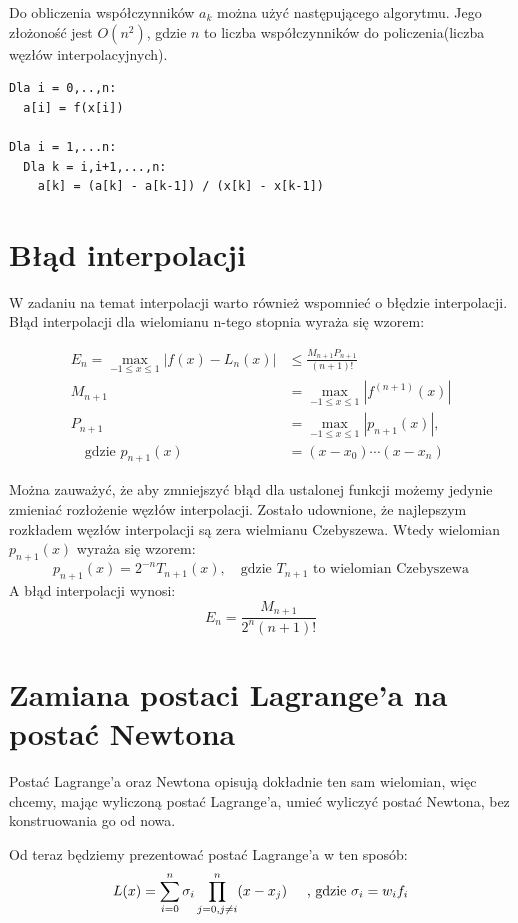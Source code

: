 \documentclass[a4paper]{article}
\begin{document}
Do obliczenia współczynników $a_k$ można użyć następującego algorytmu. Jego złożoność jest $O(n^2)$,
gdzie $n$ to liczba współczynników do policzenia(liczba węzłów interpolacyjnych).

\begin{verbatim}
Dla i = 0,..,n:
  a[i] = f(x[i])

Dla i = 1,...n:
  Dla k = i,i+1,...,n:
    a[k] = (a[k] - a[k-1]) / (x[k] - x[k-1])
\end{verbatim}


\section{Błąd interpolacji}
W zadaniu na temat interpolacji warto również wspomnieć o błędzie interpolacji. Błąd interpolacji
dla wielomianu n-tego stopnia wyraża się wzorem:

\begin{align*}
  E_n = \max_{-1\le x\le 1} |f(x) - L_n(x)| &\le \frac{M_{n+1}P_{n+1}}{(n+1)!}\\
M_{n+1} &= \max_{-1 \le x \le 1} |f^(n+1)(x)| \\
P_{n+1} &= \max_{-1 \le x \le 1} |p_{n+1}(x)|, \\
\quad \text{gdzie } p_{n+1}(x) &= (x - x_0)\cdots(x-x_n)
\end{align*}

Można zauważyć, że aby zmniejszyć błąd dla ustalonej funkcji możemy jedynie zmieniać rozłożenie
węzłów interpolacji. Zostało udownione, że najlepszym rozkładem węzłów interpolacji są zera 
wielmianu Czebyszewa. Wtedy wielomian $p_{n+1}(x)$ wyraża się wzorem:
$$ p_{n+1}(x) = 2^{-n}T_{n+1}(x), \quad \text{gdzie $T_{n+1}$ to wielomian Czebyszewa} $$
A błąd interpolacji wynosi:
$$
E_n = \frac{M_{n+1}}{2^n(n+1)!}
$$

\color{black}


\section{Zamiana postaci Lagrange'a na postać Newtona}
Postać Lagrange'a oraz Newtona opisują dokładnie ten sam wielomian, więc 
chcemy, mając wyliczoną postać Lagrange'a, umieć wyliczyć postać Newtona, bez
konstruowania go od nowa.

Od teraz będziemy prezentować postać Lagrange'a w ten sposób:
$$ L(x) = \sum_{i=0}^{n} \sigma_i \prod_{j=0, j\neq i}^{n}(x - x_j) 
\text{\hspace{0.5cm}, gdzie } \sigma_i = w_if_i $$
\end{document}
